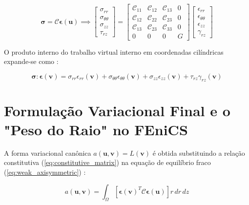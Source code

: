 \begin{equation}
  \mathbf{\sigma} = \mathbf{\mathcal{C}} \mathbf{\epsilon}(\mathbf{u}) \implies
  \begin{bmatrix}
    \sigma_{rr} \\ \sigma_{\theta\theta} \\ \sigma_{zz} \\ \tau_{rz}
  \end{bmatrix} =
  \begin{bmatrix}
    \mathcal{C}_{11} & \mathcal{C}_{12} & \mathcal{C}_{13} & 0 \\
    \mathcal{C}_{12} & \mathcal{C}_{22} & \mathcal{C}_{23} & 0 \\
    \mathcal{C}_{13} & \mathcal{C}_{23} & \mathcal{C}_{33} & 0 \\
    0 & 0 & 0 & G
  \end{bmatrix}
  \begin{bmatrix}
    \epsilon_{rr} \\ \epsilon_{\theta\theta} \\ \epsilon_{zz} \\ \gamma_{rz}
  \end{bmatrix}
  \label{eq:constitutive_matrix}
\end{equation}

O produto interno do trabalho virtual interno em coordenadas cilíndricas expande-se como \cite{logg2012automated}:

\begin{equation}
  \mathbf{\sigma} : \mathbf{\epsilon}(\mathbf{v}) = \sigma_{rr} \epsilon_{rr}(\mathbf{v}) + \sigma_{\theta\theta} \epsilon_{\theta\theta}(\mathbf{v}) + \sigma_{zz} \epsilon_{zz}(\mathbf{v}) + \tau_{rz} \gamma_{rz}(\mathbf{v})
  \label{eq:stress_strain_inner}
\end{equation}

\section{Formulação Variacional Final e o "Peso do Raio" no FEniCS}

A forma variacional canônica $a(\mathbf{u}, \mathbf{v}) = L(\mathbf{v})$ é obtida substituindo a relação constitutiva (\eqref{eq:constitutive_matrix}) na equação de equilíbrio fraco (\eqref{eq:weak_axisymmetric}) \cite{logg2012automated}:

\begin{equation}
  a(\mathbf{u}, \mathbf{v}) = \int_{\Omega} \left[ \mathbf{\epsilon}(\mathbf{v})^T \mathbf{\mathcal{C}} \mathbf{\epsilon}(\mathbf{u}) \right] r \, d r \, d z
  \label{eq:bilinear_form}
\end{equation}

